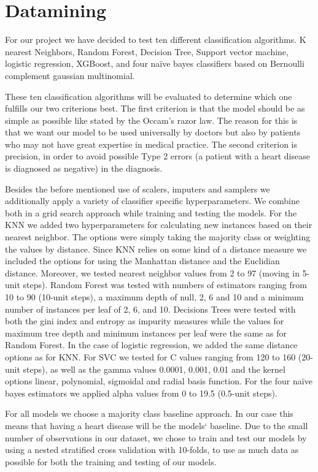 \section{Datamining} \label{sec:datamining}

For our project we have decided to test ten different classification algorithms. K nearest Neighbors, Random Forest, Decision Tree, Support vector machine, logistic regression, XGBoost, and four naïve bayes classifiers based on Bernoulli complement gaussian multinomial.

These ten classification algorithms will be evaluated to determine which one fulfills our two criterions best. The first criterion is that the model should be as simple as possible like stated by the Occam’s razor law. The reason for this is that we want our model to be used universally by doctors but also by patients who may not have great expertise in medical practice. The second criterion is precision, in order to avoid possible Type 2 errors (a patient with a heart disease is diagnosed as negative) in the diagnosis.

Besides the before mentioned use of scalers, imputers and samplers we additionally apply a variety of classifier specific hyperparameters. We combine both in a grid search approach while training and testing the models. For the KNN we added two hyperparameters for calculating new instances based on their nearest neighbor. The options were simply taking the majority class or weighting the values by distance. Since KNN relies on some kind of a distance measure we included the options for using the Manhattan distance and the Euclidian distance. Moreover, we tested nearest neighbor values from 2 to 97 (moving in 5-unit steps). Random Forest was tested with numbers of estimators ranging from 10 to 90 (10-unit steps), a maximum depth of null, 2, 6 and 10 and a minimum number of instances per leaf of 2, 6, and 10. Decisions Trees were tested with both the gini index and entropy as impurity measures while the values for maximum tree depth and minimum instances per leaf were the same as for Random Forest. In the case of logistic regression, we added the same distance options as for KNN. For SVC we tested for C values ranging from 120 to 160 (20-unit steps), as well as the gamma values 0.0001, 0.001, 0.01 and the kernel options linear, polynomial, sigmoidal and radial basis function. For the four naïve bayes estimators we applied alpha values from 0 to 19.5 (0.5-unit steps). 

For all models we choose a majority class baseline approach. In our case this means that having a heart disease will be the models` baseline. Due to the small number of observations in our dataset, we chose to train and test our models by using a nested stratified cross validation with 10-folds, to use as much data as possible for both the training and testing of our models. 

